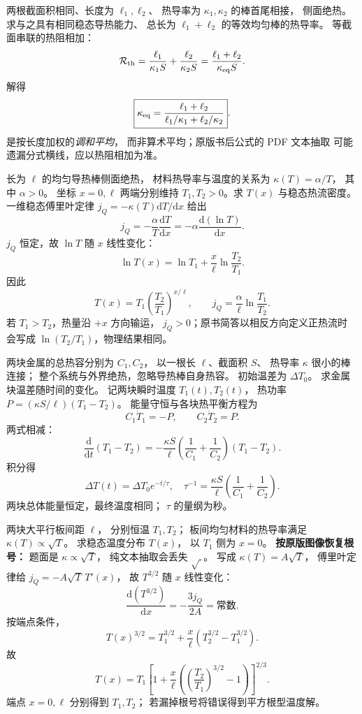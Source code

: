 两根截面积相同、长度为 $\ell_1,\ell_2$、
热导率为 $\kappa_1,\kappa_2$ 的棒首尾相接，
侧面绝热。求与之具有相同稳态导热能力、
总长为 $\ell_1+\ell_2$ 的等效均匀棒的热导率。
\exsolution
等截面串联的热阻相加：
\[
\mathcal R_{\rm th}=
\frac{\ell_1}{\kappa_1 S}+\frac{\ell_2}{\kappa_2 S}
=\frac{\ell_1+\ell_2}{\kappa_{\rm eq}S}.
\]
解得
\[
\boxed{\kappa_{\rm eq}=
\frac{\ell_1+\ell_2}
{\ell_1/\kappa_1+\ell_2/\kappa_2}}.
\]
\excheck 是按长度加权的\emph{调和平均}，
而非算术平均；原版书后公式的 PDF 文本抽取
可能遗漏分式横线，应以热阻相加为准。

长为 $\ell$ 的均匀导热棒侧面绝热，
材料热导率与温度的关系为
$\kappa(T)=\alpha/T$，
其中 $\alpha>0$。
坐标 $x=0,\ell$ 两端分别维持
$T_1,T_2>0$。求 $T(x)$ 与稳态热流密度。
\exsolution
一维稳态傅里叶定律
$j_Q=-\kappa(T)\mathrm dT/\mathrm dx$
给出
\[
j_Q=-\frac{\alpha}{T}\frac{\mathrm dT}{\mathrm dx}
=-\alpha\frac{\mathrm d(\ln T)}{\mathrm dx}.
\]
$j_Q$ 恒定，故 $\ln T$ 随 $x$ 线性变化：
\[
\ln T(x)=\ln T_1+
\frac{x}{\ell}\ln\frac{T_2}{T_1}.
\]
因此
\[
\boxed{T(x)=T_1\left(\frac{T_2}{T_1}\right)^{x/\ell}},
\qquad
\boxed{j_Q=\frac{\alpha}{\ell}\ln\frac{T_1}{T_2}}.
\]
\excheck 若 $T_1>T_2$，热量沿 $+x$ 方向输运，
$j_Q>0$；原书简答以相反方向定义正热流时
会写成 $\ln(T_2/T_1)$，物理结果相同。

两块金属的总热容分别为 $C_1,C_2$，
以一根长 $\ell$、截面积 $S$、
热导率 $\kappa$ 很小的棒连接；
整个系统与外界绝热，忽略导热棒自身热容。
初始温差为 $\Delta T_0$。
求金属块温差随时间的变化。
\exsolution
记两块瞬时温度 $T_1(t),T_2(t)$，
热功率 $P=(\kappa S/\ell)(T_1-T_2)$。
能量守恒与各块热平衡方程为
\[
C_1\dot T_1=-P,\qquad C_2\dot T_2=P.
\]
两式相减：
\[
\frac{\mathrm d}{\mathrm dt}(T_1-T_2)
=-\frac{\kappa S}{\ell}
\left(\frac1{C_1}+\frac1{C_2}\right)(T_1-T_2).
\]
积分得
\[
\boxed{\Delta T(t)=\Delta T_0e^{-t/\tau}},\quad
\boxed{\tau^{-1}=\frac{\kappa S}{\ell}
\left(\frac1{C_1}+\frac1{C_2}\right)}.
\]
\excheck 两块总体能量恒定，最终温度相同；
$\tau$ 的量纲为秒。

两块大平行板间距 $\ell$，
分别恒温 $T_1,T_2$；
板间均匀材料的热导率满足
$\kappa(T)\propto\sqrt{T}$。
求稳态温度分布 $T(x)$，
以 $T_1$ 侧为 $x=0$。
\exsolution
\textbf{按原版图像恢复根号：}
题面是 $\kappa\propto\sqrt{T}$，
纯文本抽取会丢失 $\sqrt{\ }$。
写成 $\kappa(T)=A\sqrt T$，
傅里叶定律给
$j_Q=-A\sqrt T\,T'(x)$，
故 $T^{3/2}$ 随 $x$ 线性变化：
\[
\frac{\mathrm d(T^{3/2})}{\mathrm dx}
=-\frac{3j_Q}{2A}=\text{常数}.
\]
按端点条件，
\[
T(x)^{3/2}
=T_1^{3/2}+\frac{x}{\ell}
(T_2^{3/2}-T_1^{3/2}).
\]
故
\[
\boxed{T(x)=T_1
\left[1+\frac{x}{\ell}
\left(\left(\frac{T_2}{T_1}\right)^{3/2}-1\right)
\right]^{2/3}}.
\]
\excheck 端点 $x=0,\ell$ 分别得到 $T_1,T_2$；
若漏掉根号将错误得到平方根型温度解。

